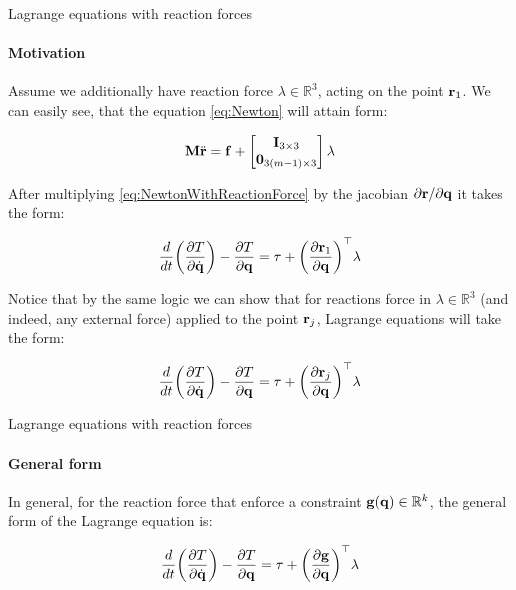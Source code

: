 \documentclass{beamer}
\begin{document}
\begin{frame}{Lagrange equations with reaction forces}
\framesubtitle{Motivation}
\begin{flushleft}

Assume we additionally have reaction force $\lambda \in \mathbb{R}^3$, acting on the point $\mathbf{r}_1$. We can easily see, that the equation \eqref{eq:Newton} will attain form:

\begin{equation}
\label{eq:NewtonWithReactionForce}
    \mathbf{M}\ddot{\mathbf{r}} = \mathbf{f} + 
    \begin{bmatrix} \mathbf{I}_{3 \times 3} \\ \mathbf{0}_{3(m-1) \times 3} \end{bmatrix} 
    \lambda
\end{equation}

After multiplying \eqref{eq:NewtonWithReactionForce} by the jacobian $\partial \mathbf{r} / \partial \mathbf{q}$ it takes the form:

\begin{equation}
\label{eq:LagrangeWithReactionForce}
    \frac{d}{dt} \bigg( 
    \frac{\partial T }{\partial \dot{\mathbf{q}}}
    \bigg) - 
    \frac{\partial T }{\partial \mathbf{q}} = \tau + 
    \bigg( \frac{\partial \mathbf{r}_1 }{\partial \mathbf{q}} \bigg) ^\top
    \lambda
\end{equation}

Notice that by the same logic we can show that for reactions force in $\lambda \in \mathbb{R}^3$ (and indeed, any external force) applied to the point $\mathbf{r}_j$, Lagrange equations will take the form:

\begin{equation}
    \frac{d}{dt} \bigg( 
    \frac{\partial T }{\partial \dot{\mathbf{q}}}
    \bigg) - 
    \frac{\partial T }{\partial \mathbf{q}} = \tau + 
    \bigg( \frac{\partial \mathbf{r}_j }{\partial \mathbf{q}} \bigg) ^\top
    \lambda
\end{equation}

\end{flushleft}
\end{frame}




\begin{frame}{Lagrange equations with reaction forces}
\framesubtitle{General form}
\begin{flushleft}

In general, for the reaction force that enforce a constraint $\mathbf{g}(\mathbf{q}) \in \mathbb{R}^k$, the general form of the Lagrange equation is:

\begin{equation}
    \frac{d}{dt} \bigg( 
    \frac{\partial T }{\partial \dot{\mathbf{q}}}
    \bigg) - 
    \frac{\partial T }{\partial \mathbf{q}} = \tau + 
    \bigg( \frac{\partial \mathbf{g} }{\partial \mathbf{q}} \bigg) ^\top
    \lambda
\end{equation}

\end{flushleft}
\end{frame}
\end{document}
